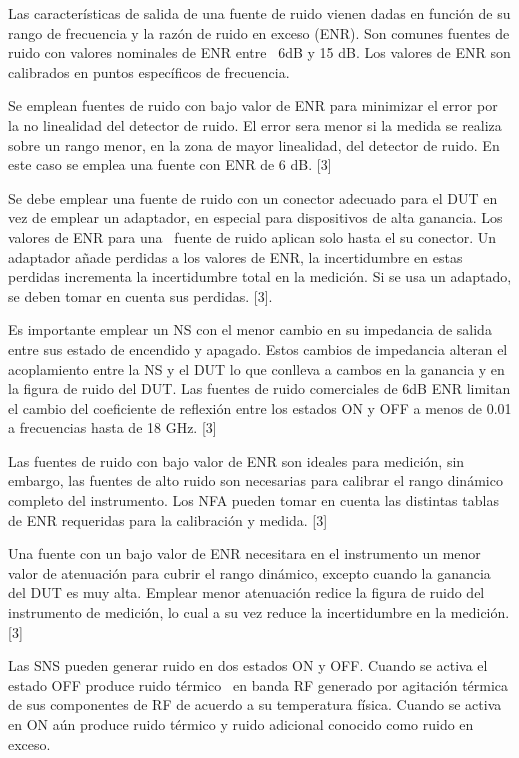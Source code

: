 \documentclass{article}
\begin{document}
Las características de salida de una fuente de ruido vienen dadas en función de su rango de frecuencia y la razón de ruido en exceso (ENR). Son comunes fuentes de ruido con valores nominales de ENR entre \ 6dB y 15 dB. Los valores de ENR son calibrados en puntos específicos de frecuencia.

Se emplean fuentes de ruido con bajo valor de ENR para minimizar el error por la no linealidad del detector de ruido. El error sera menor si la medida se realiza sobre un rango menor, en la zona de mayor linealidad, del detector de ruido. En este caso se emplea una fuente con ENR de 6 dB. [3]

Se debe emplear una fuente de ruido con un conector adecuado para el DUT en vez de emplear un adaptador, en especial para dispositivos de alta ganancia. Los valores de ENR para una \ fuente de ruido aplican solo hasta el su conector. Un adaptador añade perdidas a los valores de ENR, la incertidumbre en estas perdidas incrementa la incertidumbre total en la medición. Si se usa un adaptado, se deben tomar en cuenta sus perdidas. [3].

Es importante emplear un NS con el menor cambio en su impedancia de salida entre sus estado de encendido y apagado. Estos cambios de impedancia alteran el acoplamiento entre la NS y el DUT lo que conlleva a cambos en la ganancia y en la figura de ruido del DUT. Las fuentes de ruido comerciales de 6dB ENR limitan el cambio del coeficiente de reflexión entre los estados ON y OFF a menos de 0.01 a frecuencias hasta de 18 GHz. [3]

Las fuentes de ruido con bajo valor de ENR son ideales para medición, sin embargo, las fuentes de alto ruido son necesarias para calibrar el rango dinámico completo del instrumento. Los NFA pueden tomar en cuenta las distintas tablas de ENR requeridas para la calibración y medida. [3]

Una fuente con un bajo valor de ENR necesitara en el instrumento un menor valor de atenuación para cubrir el rango dinámico, excepto cuando la ganancia del DUT es muy alta. Emplear menor atenuación redice la figura de ruido del instrumento de medición, lo cual a su vez reduce la incertidumbre en la medición. [3]

Las SNS pueden generar ruido en dos estados ON y OFF. Cuando se activa el estado OFF produce ruido térmico \ en banda RF generado por agitación térmica de sus componentes de RF de acuerdo a su temperatura física. Cuando se activa en ON aún produce ruido térmico y ruido adicional conocido como ruido en exceso.
\end{document}
